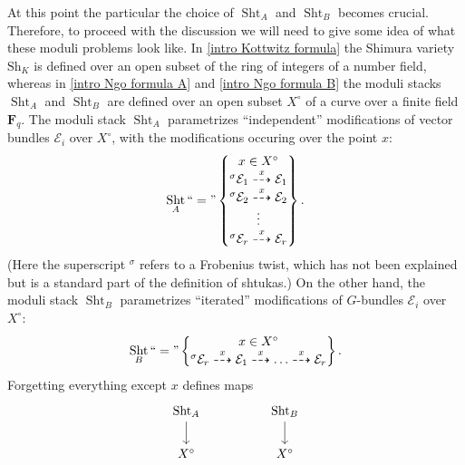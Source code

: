 \documentclass[reqno]{amsart}
\numberwithin{equation}{section}
\newcommand{\F}{\mathbf{F}}
\newcommand{\Cal}[1]{\mathcal{#1}}
\newcommand{\mrm}[1]{\mathrm{#1}}
\DeclareMathOperator{\Sht}{Sht}
\theoremstyle{remark}
\numberwithin{equation}{section}
\begin{document}
At this point the particular the choice of $\Sht_A$ and $\Sht_B$ becomes crucial. Therefore, to proceed with the discussion we will need to give some idea of what these moduli problems look like. In \eqref{intro Kottwitz formula} the Shimura variety $\mrm{Sh}_K$ is defined over an open subset of the ring of integers of a number field, whereas in \eqref{intro Ngo formula A} and \eqref{intro Ngo formula B}  the moduli stacks $\Sht_A$ and $\Sht_B$ are defined over an open subset $X^{\circ}$ of a curve over a finite field $\F_q$. The moduli stack $\Sht_A$ parametrizes ``independent'' modifications of vector bundles $\Cal{E}_i$ over $X^{\circ}$, with the modifications occuring over the point $x$: 
\[
\Sht_A ``="  \left\{ \begin{array}{@{}c@{}}  x \in X^{\circ} \\ 
  {}^{\sigma}\Cal{E}_1 \stackrel{x}\dashrightarrow  \Cal{E}_1\\
  {}^{\sigma}\Cal{E}_2 \stackrel{x}\dashrightarrow \Cal{E}_2 \\
  \vdots  \\
   {}^{\sigma}\Cal{E}_r  \stackrel{x}\dashrightarrow \Cal{E}_r	
 \end{array} \right\}   .
\]
(Here the superscript ${}^{\sigma}$ refers to a Frobenius twist, which has not been explained but is a standard part of the definition of shtukas.) On the other hand, the moduli  stack $\Sht_B$ parametrizes ``iterated'' modifications of $G$-bundles $\Cal{E}_i$ over $X^{\circ}$: 
\[
\Sht_B `` = " \left\{ \begin{array}{@{}c@{}}  x \in X^{\circ} \\
 {}^{\sigma}\Cal{E}_r \stackrel{x}\dashrightarrow \Cal{E}_1 \stackrel{x}\dashrightarrow  \ldots \stackrel{x}\dashrightarrow  \Cal{E}_r 
 \end{array} \right\}    .
\]	
Forgetting everything except $x$ defines maps 
\[
\begin{tikzcd}
\Sht_A \ar[d] & & \Sht_B \ar[d] \\
 X^{\circ}&  &X^{\circ}
 \end{tikzcd}
\]
\end{document}
